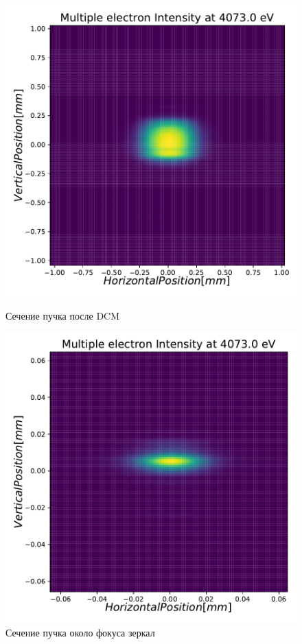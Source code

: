 \begin{figure}[h]
\begin{minipage}{0.3\textwidth}
		\includegraphics[width=\textwidth]{pic/3_harm_after_DCM_2d.pdf}
		\caption{Сечение пучка после DCM}
		\label{fig:3_harm_after_DCM_2d}
	\end{minipage} 
	\begin{minipage}{0.3\textwidth}
		\centering
		\includegraphics[width=\textwidth]{pic/3_harm_after_Sph_Mir_2d.pdf}
		\caption{Сечение пучка около фокуса зеркал}
		\label{fig:3_harm_after_Sph_Mir_2d}
	\end{minipage} 
\end{figure}
